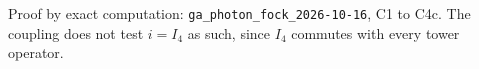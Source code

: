 Proof by exact computation: \texttt{ga\_photon\_fock\_2026-10-16}, C1 to C4c. The coupling does not test $i = I_4$ as such, since $I_4$ commutes with every tower operator.
